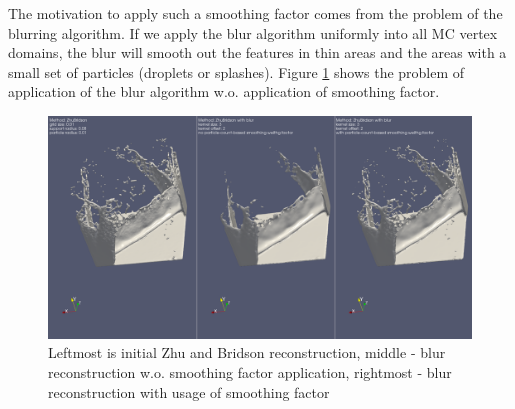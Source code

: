 The motivation to apply such a smoothing factor comes from the problem of the blurring algorithm. If we apply the blur algorithm uniformly into all MC vertex domains, the blur will smooth out the features in thin areas and the areas with a small set of particles (droplets or splashes). Figure \ref{fig:smoothing_factor_influence} shows the problem of application of the blur algorithm w.o. application of smoothing factor.

\begin{figure}[H]
	\begin{center}
			\includegraphics[width=\textwidth]{figures/View2.png}		
	\end{center}
	\caption{Leftmost is initial Zhu and Bridson reconstruction, middle - blur reconstruction w.o. smoothing factor application, rightmost - blur reconstruction with usage of smoothing factor}
	\label{fig:smoothing_factor_influence}
\end{figure}


